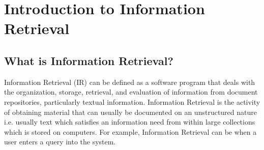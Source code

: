 \chapter{Introduction to Information Retrieval}

\section{What is Information Retrieval? \cite{gfg-what-is-ir}}
Information Retrieval (IR) can be defined as a software program that deals with the organization, storage, retrieval, and evaluation of information from document repositories, particularly textual information. Information Retrieval is the activity of obtaining material that can usually be documented on an unstructured nature i.e. usually text which satisfies an information need from within large collections which is stored on computers. For example, Information Retrieval can be when a user enters a query into the system. 

